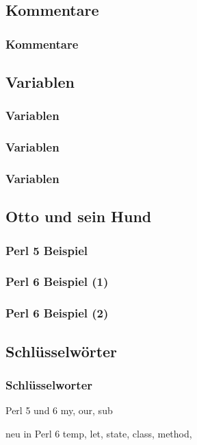 \subsection{Kommentare}
\begin{frame}
	\frametitle{Kommentare}
	
\end{frame}


\subsection{Variablen}
\begin{frame}
	\frametitle{Variablen}
	
\end{frame}
\begin{frame}
	\frametitle{Variablen}
	
\end{frame}
\begin{frame}
	\frametitle{Variablen}
	
\end{frame}


\subsection{Otto und sein Hund}
\begin{frame}
	\frametitle{Perl 5 Beispiel}
	
\end{frame}
\begin{frame}
	\frametitle{Perl 6 Beispiel (1)}
	
\end{frame}
\begin{frame}
	\frametitle{Perl 6 Beispiel (2)}
	
\end{frame}



\subsection{Schlüsselwörter}
\begin{frame}
	\frametitle{Schlüsselworter}
	
	\begin{block}{Perl 5 und 6}
	my, our, sub
	\end{block}
	\begin{block}{neu in Perl 6}
	temp, let, state, class, method, \textellipsis
	\end{block}
\end{frame}

